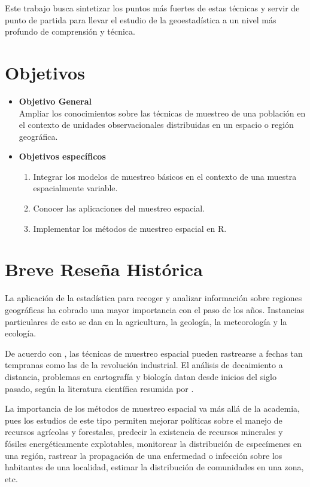 \documentclass[14pt]{extarticle}
\begin{document}
Este trabajo busca sintetizar los puntos más fuertes de estas técnicas y servir de punto de partida para llevar el estudio de la geoestadística a un nivel más profundo de comprensión y técnica. 


\newpage
\section*{Objetivos}
\begin{itemize}
	\item \textbf{Objetivo General}\\
	Ampliar los conocimientos sobre las técnicas de muestreo de una población en el contexto de unidades observacionales distribuidas en un espacio o región geográfica. 
	\item \textbf{Objetivos específicos}	
	\begin{enumerate}
		\item Integrar los modelos de muestreo básicos en el contexto de una muestra espacialmente variable. 
		\item Conocer las aplicaciones del muestreo espacial. 
		\item Implementar los métodos de muestreo espacial en R. 
	\end{enumerate}
\end{itemize}

\newpage
\section{Breve Reseña Histórica}
La aplicación de la estadística para recoger y analizar información sobre regiones geográficas ha cobrado una mayor importancia con el paso de los años. Instancias particulares de esto se dan en la agricultura\cite{Benedetti.2015}, la geología\cite{Thompson.2012}, la meteorología\cite{Cressie.1986} y la ecología\cite{Brus.2022}. 

De acuerdo con \cite{Alinghaus.1996}, las técnicas de muestreo espacial pueden rastrearse a fechas tan tempranas como las de la revolución industrial. El análisis de decaimiento a distancia, problemas en cartografía y biología datan desde inicios del siglo pasado, según la literatura científica resumida por \cite{Alinghaus.1996}. 

La importancia de los métodos de muestreo espacial va más allá de la academia, pues los estudios de este tipo permiten mejorar políticas sobre el manejo de recursos agrícolas y forestales\cite{Benedetti.2015}, predecir la existencia de recursos minerales y fósiles energéticamente explotables\cite{Thompson.2012, Cressie.1986, Journel.1987}, monitorear la distribución de especímenes en una región\cite{Brus.2022}, rastrear la propagación de una enfermedad o infección sobre los habitantes de una localidad, estimar la distribución de comunidades en una zona\cite{Benedetti.2015}, etc. 
\end{document}
